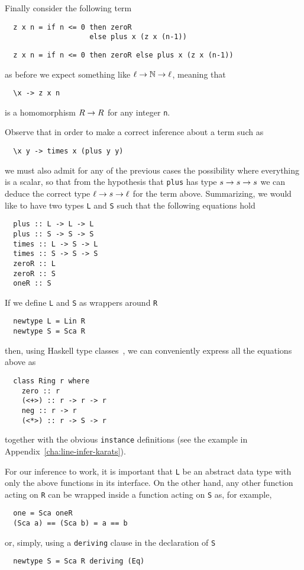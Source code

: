 Finally consider the following term
\ifafive
\begin{lstlisting}
  z x n = if n <= 0 then zeroR
                    else plus x (z x (n-1))
\end{lstlisting}
\else
\begin{lstlisting}
  z x n = if n <= 0 then zeroR else plus x (z x (n-1))
\end{lstlisting}
\fi
as before we expect something like $\ell\rightarrow\mathbb{N}\rightarrow\ell$, meaning that
\begin{lstlisting}
  \x -> z x n
\end{lstlisting}
is a homomorphism $R\rightarrow R$ for any integer \lstinline{n}.

Observe that in order to make a correct inference about a term such as
\begin{lstlisting}
  \x y -> times x (plus y y)
\end{lstlisting}
we must also admit for any of the previous cases the possibility where
everything is a scalar, so that from the hypothesis that
\lstinline{plus} has type $s\rightarrow s\rightarrow s$ we can deduce the correct type
$\ell\rightarrow s\rightarrow\ell$ for the term above. Summarizing, we would like to
have two types \lstinline{L} and \lstinline{S} such that the following
equations hold
\begin{lstlisting}
  plus :: L -> L -> L
  plus :: S -> S -> S
  times :: L -> S -> L
  times :: S -> S -> S
  zeroR :: L
  zeroR :: S
  oneR :: S
\end{lstlisting}

If we define \lstinline{L} and \lstinline{S} as wrappers around
\lstinline{R}
\begin{lstlisting}
  newtype L = Lin R
  newtype S = Sca R
\end{lstlisting}
then, using Haskell type
classes~\cite{Walder+Blott-ad-hoc-polymorphism}, we can conveniently
express all the equations above as
\begin{lstlisting}
  class Ring r where
    zero :: r
    (<+>) :: r -> r -> r
    neg :: r -> r
    (<*>) :: r -> S -> r
\end{lstlisting}
together with the obvious \lstinline{instance} definitions (see the
example in Appendix~\ref{cha:line-infer-karats}). 

  For our
inference to work, it is important that \lstinline{L} be an abstract
data type with only the above functions in its interface. On the other
hand, any other function acting on \lstinline{R} can be wrapped inside
a function acting on \lstinline{S} as, for example,
\begin{lstlisting}
  one = Sca oneR
  (Sca a) == (Sca b) = a == b
\end{lstlisting}
or, simply, using a \lstinline{deriving} clause in the declaration of
\lstinline{S}
\begin{lstlisting}
  newtype S = Sca R deriving (Eq)
\end{lstlisting}

